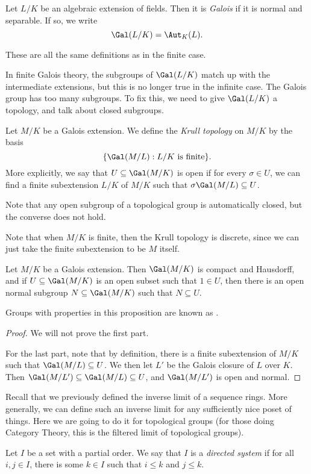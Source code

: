 \documentclass[a4paper]{article}
\begin{document}
\begin{defi}
  Let $L/K$ be an algebraic extension of fields. Then it is \emph{Galois} if it is normal and separable. If so, we write
  \[
    \Gal(L/K) = \Aut_K(L).
  \]
\end{defi}
These are all the same definitions as in the finite case.

In finite Galois theory, the subgroups of $\Gal(L/K)$ match up with the intermediate extensions, but this is no longer true in the infinite case. The Galois group has too many subgroups. To fix this, we need to give $\Gal(L/K)$ a topology, and talk about closed subgroups.

\begin{defi}
  Let $M/K$ be a Galois extension. We define the \emph{Krull topology} on $M/K$ by the basis
  \[
    \{\Gal(M/L): L/K\text{ is finite}\}.
  \]
  More explicitly, we say that $U \subseteq \Gal(M/K)$ is open if for every $\sigma \in U$, we can find a finite subextension $L/K$ of $M/K$ such that $\sigma \Gal(M/L) \subseteq U$.
\end{defi}
Note that any open subgroup of a topological group is automatically closed, but the converse does not hold.

Note that when $M/K$ is finite, then the Krull topology is discrete, since we can just take the finite subextension to be $M$ itself.

\begin{prop}
  Let $M/K$ be a Galois extension. Then $\Gal(M/K)$ is compact and Hausdorff, and if $U \subseteq \Gal(M/K)$ is an open subset such that $1 \in U$, then there is an open normal subgroup $N \subseteq \Gal(M/K)$ such that $N \subseteq U$.
\end{prop}
Groups with properties in this proposition are known as .

\begin{proof}
  We will not prove the first part.

  For the last part, note that by definition, there is a finite subextension of $M/K$ such that $\Gal(M/L) \subseteq U$. We then let $L'$ be the Galois closure of $L$ over $K$. Then $\Gal(M/L') \subseteq \Gal(M/L) \subseteq U$, and $\Gal(M/L')$ is open and normal.
\end{proof}

Recall that we previously defined the inverse limit of a sequence rings. More generally, we can define such an inverse limit for any sufficiently nice poset of things. Here we are going to do it for topological groups (for those doing Category Theory, this is the filtered limit of topological groups).
\begin{defi}
  Let $I$ be a set with a partial order. We say that $I$ is a \emph{directed system} if for all $i, j \in I$, there is some $k \in I$ such that $i \leq k$ and $j \leq k$.
\end{defi}
\end{document}

